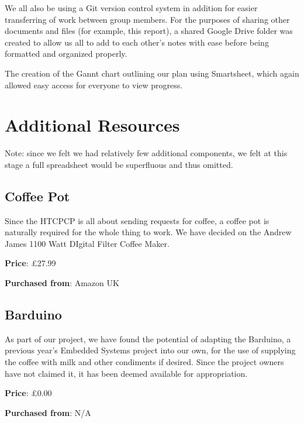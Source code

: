 \documentclass[12pt, a4paper]{article}
\begin{document}
We all also be using a Git version control system in addition for easier
transferring of work between group members. For the purposes of sharing other
documents and files (for example, this report), a shared Google Drive folder was
created to allow us all to add to each other's notes with ease before being
formatted and organized properly.

The creation of the Gannt chart outlining our plan using Smartsheet, which again
allowed easy access for everyone to view progress.


\section{Additional Resources}
Note: since we felt we had relatively few additional components, we felt at this
stage a full spreadsheet would be superfluous and thus omitted.


\subsection{Coffee Pot}
Since the HTCPCP is all about sending requests for coffee, a coffee pot is
naturally required for the whole thing to work. We have decided on the Andrew
James 1100 Watt DIgital Filter Coffee Maker.

\textbf{Price}: £27.99

\textbf{Purchased from}: Amazon UK


\subsection{Barduino}
As part of our project, we have found the potential of adapting the Barduino, a
previous year’s Embedded Systems project into our own, for the use of supplying
the coffee with milk and other condiments if desired. Since the project owners
have not claimed it, it has been deemed available for appropriation.

\textbf{Price}: £0.00

\textbf{Purchased from}: N/A
\end{document}
